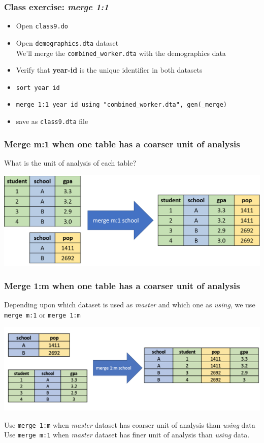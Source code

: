\documentclass[11pt]{beamer}
\begin{document}
\begin{frame}
\frametitle{Class exercise: \textit{merge 1:1}}
\begin{itemize}
\item Open \texttt{class9.do} 
\item Open \texttt{demographics.dta} dataset \\
\bigskip
We'll merge the \texttt{combined\_worker.dta} with the demographics data\\
\bigskip
\item Verify that \textbf{year-id} is the unique identifier in both datasets
\item \texttt{sort year id}
\item \texttt{merge 1:1 year id using "combined\_worker.dta", gen(\_merge)}
\item save as \texttt{class9.dta} file
\end{itemize}
\end{frame}


\begin{frame}
\frametitle{Merge m:1 when one table has a coarser unit of analysis}
What is the unit of analysis of each table?
\begin{center}
	\includegraphics[width=\textwidth]{images/merge_many.png}
\end{center}
\end{frame}


\begin{frame}
\frametitle{Merge 1:m when one table has a coarser unit of analysis}
Depending upon which dataset is used as \textit{master} and which one as \textit{using}, we use \texttt{merge m:1} or \texttt{merge 1:m}
\begin{center}
	\includegraphics[width=\textwidth]{images/merge}
\end{center}
\pause 
Use \texttt{merge 1:m} when \textit{master} dataset has coarser unit of analysis than \textit{using} data\\
Use \texttt{merge m:1} when \textit{master} dataset has finer unit of analysis than \textit{using} data.
\end{frame}
\end{document}
